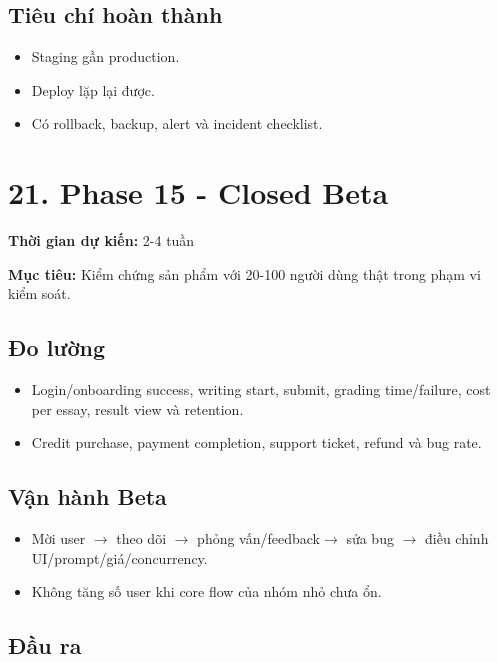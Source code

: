 \documentclass[
  11pt,
  a4paper,
]{article}
\begin{document}
\subsection{Tiêu chí hoàn
thành}\label{tiuxeau-chuxed-houxe0n-thuxe0nh-14}

\begin{itemize}
\item
  Staging gần production.
\item
  Deploy lặp lại được.
\item
  Có rollback, backup, alert và incident checklist.
\end{itemize}

\section{21. Phase 15 - Closed Beta}\label{phase-15---closed-beta}

\textbf{Thời gian dự kiến:} 2-4 tuần

\textbf{Mục tiêu:} Kiểm chứng sản phẩm với 20-100 người dùng thật trong
phạm vi kiểm soát.

\subsection{Đo lường}\label{ux111o-lux1b0ux1eddng}

\begin{itemize}
\item
  Login/onboarding success, writing start, submit, grading time/failure,
  cost per essay, result view và retention.
\item
  Credit purchase, payment completion, support ticket, refund và bug
  rate.
\end{itemize}

\subsection{Vận hành Beta}\label{vux1eadn-huxe0nh-beta}

\begin{itemize}
\item
  Mời user \(\rightarrow\) theo dõi \(\rightarrow\) phỏng vấn/feedback\newline \(\rightarrow\) sửa bug \(\rightarrow\) điều chỉnh
  UI/prompt/giá/concurrency.
\item
  Không tăng số user khi core flow của nhóm nhỏ chưa ổn.
\end{itemize}

\subsection{Đầu ra}\label{ux111ux1ea7u-ra-15}
\end{document}

